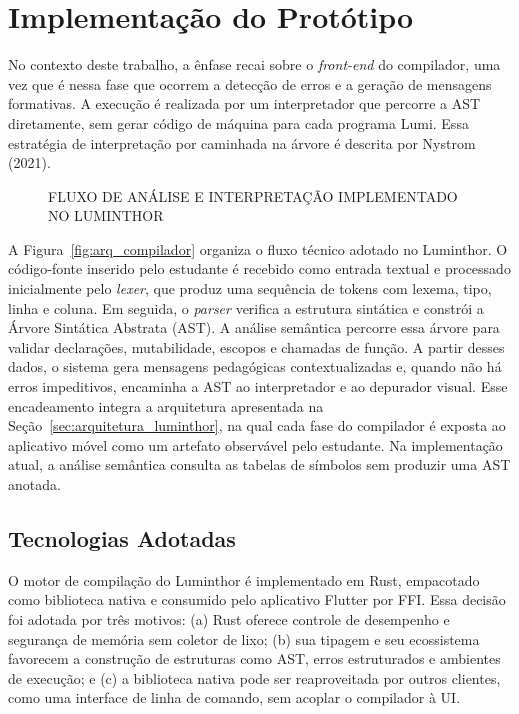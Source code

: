\documentclass[
    12pt
    ,oneside
    ,a4paper
    ,chapter=TITLE
    ,section=TITLE
    ,sumario=abnt-6027-2012]{abntex2}
\renewcommand{\legenda}[2][]{%
    \centering
    \caption[\MakeTextUppercase{#2}]{\maybeLabel{#1}\MakeTextUppercase{#2}}%
}
\begin{document}


\section{Implementação do Protótipo}

No contexto deste trabalho, a ênfase recai sobre o \textit{front-end} do compilador, uma vez
que é nessa fase que ocorrem a detecção de erros e a geração de mensagens formativas. A execução é realizada por um interpretador que percorre a AST diretamente,
sem gerar código de máquina para cada programa Lumi. Essa estratégia de interpretação
por caminhada na árvore é descrita por Nystrom (2021).

\begin{figure}[htb]
\centering
\legenda[fig:arq_compilador]{Fluxo de análise e interpretação implementado no Luminthor}

\end{figure}

A Figura~\ref{fig:arq_compilador} organiza o fluxo técnico adotado no Luminthor. O código-fonte
inserido pelo estudante é recebido como entrada textual e processado inicialmente pelo
\textit{lexer}, que produz uma sequência de tokens com lexema, tipo, linha e coluna. Em seguida,
o \textit{parser} verifica a estrutura sintática e constrói a Árvore Sintática Abstrata (AST).
A análise semântica percorre essa árvore para validar declarações, mutabilidade,
escopos e chamadas de função. A partir desses dados, o sistema gera mensagens
pedagógicas contextualizadas e, quando não há erros impeditivos, encaminha a AST ao
interpretador e ao depurador visual. Esse encadeamento integra a arquitetura apresentada na
Seção~\ref{sec:arquitetura_luminthor}, na qual cada fase do compilador é exposta ao aplicativo móvel
como um artefato observável pelo estudante. Na implementação atual, a análise semântica
consulta as tabelas de símbolos sem produzir uma AST anotada.

\subsection{Tecnologias Adotadas}

O motor de compilação do Luminthor é implementado em Rust, empacotado como biblioteca
nativa e consumido pelo aplicativo Flutter por FFI. Essa decisão foi adotada por três motivos:
(a) Rust oferece controle de desempenho e segurança de memória sem coletor de lixo; (b) sua
tipagem e seu ecossistema favorecem a construção de estruturas como AST, erros estruturados e
ambientes de execução; e (c) a biblioteca nativa pode ser reaproveitada por outros clientes,
como uma interface de linha de comando, sem acoplar o compilador à UI.
\end{document}
